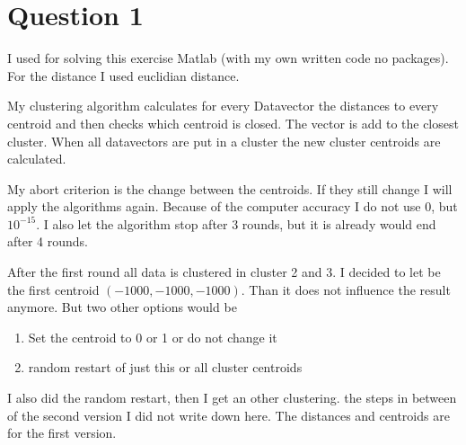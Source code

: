\section*{Question 1}
I used for solving this exercise Matlab (with my own written code no packages).
For the distance I used euclidian distance.

My clustering algorithm calculates for every Datavector the distances to
every centroid and then checks which centroid is closed. The vector is add to
the closest cluster. When all datavectors are put in a cluster the new cluster
centroids are calculated. 

My abort criterion is the change between the centroids. If they still change I
will apply the algorithms again. Because of the computer accuracy I do not use
0, but $10^{-15}$. I also let the algorithm stop after 3 rounds, but it is
already would end after 4 rounds.

After the first round all data is clustered in cluster 2 and 3. I decided to let
be the first centroid $(-1000,-1000,-1000)$. Than it does not influence the
result anymore. But two other options would be
\begin{enumerate}
  \item Set the centroid to 0 or 1 or do not change it
  \item random restart of just this or all cluster centroids
\end{enumerate}

I also did the random restart, then I get an other clustering. the steps in
between of the second version I did not write down here. The distances and
centroids are for the first version.

